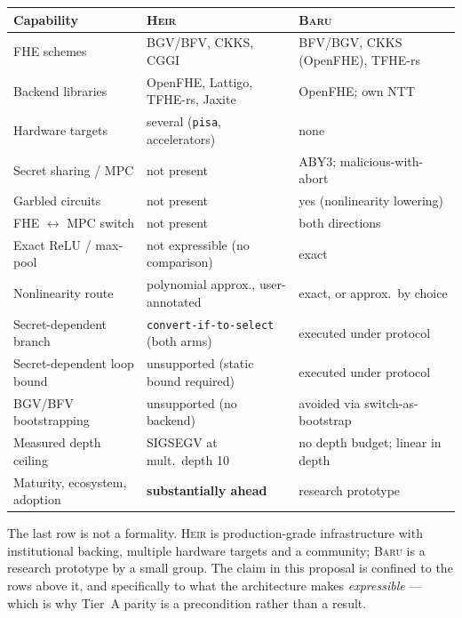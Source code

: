 \documentclass[10pt]{article}
\newcommand{\baru}{\textsc{Baru}}
\newcommand{\heir}{\textsc{Heir}}
\begin{document}
\begin{center}\small
\begin{tabular}{@{}lll@{}}
\toprule
\textbf{Capability} & \textbf{\heir{}} & \textbf{\baru{}} \\
\midrule
FHE schemes & BGV/BFV, CKKS, CGGI & BFV/BGV, CKKS (OpenFHE), TFHE-rs \\
Backend libraries & OpenFHE, Lattigo, TFHE-rs, Jaxite & OpenFHE; own NTT \\
Hardware targets & several (\texttt{pisa}, accelerators) & none \\
Secret sharing / MPC & not present & ABY3; malicious-with-abort \\
Garbled circuits & not present & yes (nonlinearity lowering) \\
FHE $\leftrightarrow$ MPC switch & not present & both directions \\
Exact ReLU / max-pool & not expressible (no comparison) & exact \\
Nonlinearity route & polynomial approx., user-annotated & exact, or approx.\ by choice \\
Secret-dependent branch & \texttt{convert-if-to-select} (both arms) & executed under protocol \\
Secret-dependent loop bound & unsupported (static bound required) & executed under protocol \\
BGV/BFV bootstrapping & unsupported (no backend) & avoided via switch-as-bootstrap \\
Measured depth ceiling & SIGSEGV at mult.\ depth 10 & no depth budget; linear in depth \\
Maturity, ecosystem, adoption & \textbf{substantially ahead} & research prototype \\
\bottomrule
\end{tabular}
\end{center}

\noindent The last row is not a formality. \heir{} is production-grade
infrastructure with institutional backing, multiple hardware targets and a
community; \baru{} is a research prototype by a small group. The claim in this
proposal is confined to the rows above it, and specifically to what the
architecture makes \emph{expressible} --- which is why Tier~A parity is a
precondition rather than a result.
\end{document}
